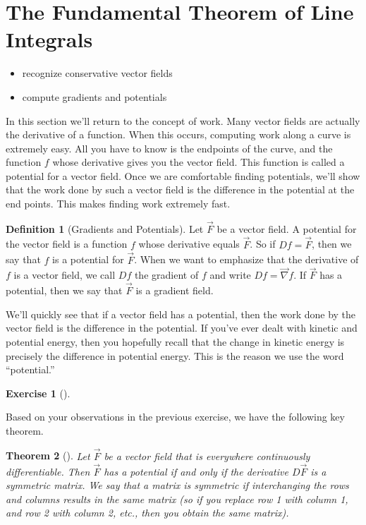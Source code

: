 \documentclass[10pt,]{book}
\theoremstyle{plain}
\newtheorem{theorem}{Theorem}[section]
\theoremstyle{definition}
\newtheorem{definition}[theorem]{Definition}
\theoremstyle{definition}
\theoremstyle{definition}
\theoremstyle{definition}
\newtheorem{exploration}[project]{Exercise}
\theoremstyle{definition}
\numberwithin{equation}{section}
\begin{document}
\section[{The Fundamental Theorem of Line Integrals}]{The Fundamental Theorem of Line Integrals}\label{section-31}
\leavevmode%
\begin{itemize}[label=\textbullet]
\item{}recognize conservative vector fields%
\item{}compute gradients and potentials%
\end{itemize}
In this section we'll return to the concept of work. Many vector fields are actually the derivative of a function. When this occurs, computing work along a curve is extremely easy. All you have to know is the endpoints of the curve, and the function \(f\) whose derivative gives you the vector field. This function is called a potential for a vector field. Once we are comfortable finding potentials, we'll show that the work done by such a vector field is the difference in the potential at the end points. This makes finding work extremely fast.%
\begin{definition}[{Gradients and Potentials}]\label{definition-35}
Let \(\vec F\) be a vector field. A potential for the vector field is a function \(f\) whose derivative equals \(\vec F\). So if \(Df=\vec F\), then we say that \(f\) is a potential for \(\vec F\). When we want to emphasize that the derivative of \(f\) is a vector field, we call \(Df\) the gradient of \(f\) and write \(Df = \vec \nabla f\). If \(\vec F\) has a potential, then we say that \(\vec F\) is a gradient field.%
\end{definition}
We'll quickly see that if a vector field has a potential, then the work done by the vector field is the difference in the potential. If you've ever dealt with kinetic and potential energy, then you hopefully recall that the change in kinetic energy is precisely the difference in potential energy. This is the reason we use the word ``potential.''%
\begin{exploration}[]\label{exploration-204}
\end{exploration}
Based on your observations in the previous exercise, we have the following key theorem.%
\begin{theorem}[{}]\label{thm_has_potential}
Let \(\vec F\) be a vector field that is everywhere continuously differentiable. Then \(\vec F\) has a potential if and only if the derivative \(D\vec F\) is a symmetric matrix. We say that a matrix is symmetric if interchanging the rows and columns results in the same matrix (so if you replace row 1 with column 1, and row 2 with column 2, etc., then you obtain the same matrix).%
\end{theorem}
\end{document}
